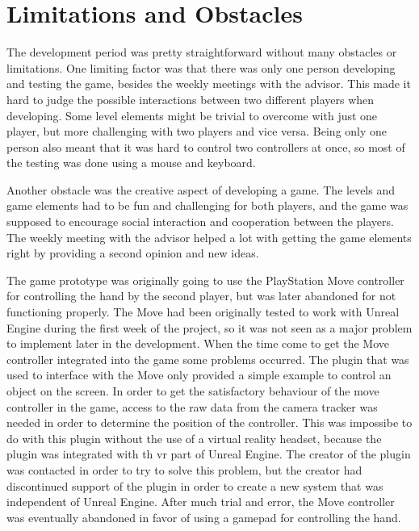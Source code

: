 \section{Limitations and Obstacles}
\label{sec:dev_limitations}
The development period was pretty straightforward without many obstacles or limitations. One limiting factor was that there was only one person developing and testing the game, besides the weekly meetings with the advisor. This made it hard to judge the possible interactions between two different players when developing. Some level elements might be trivial to overcome with just one player, but more challenging with two players and vice versa. Being only one person also meant that it was hard to control two controllers at once, so most of the testing was done using a mouse and keyboard.

Another obstacle was the creative aspect of developing a game. The levels and game elements had to be fun and challenging for both players, and the game was supposed to encourage social interaction and cooperation between the players. The weekly meeting with the advisor helped a lot with getting the game elements right by providing a second opinion and new ideas.

The game prototype was originally going to use the PlayStation Move controller for controlling the hand by the second player, but was later abandoned for not functioning properly. The Move had been originally tested to work with Unreal Engine during the first week of the project, so it was not seen as a major problem to implement later in the development. When the time come to get the Move controller integrated into the game some problems occurred. The plugin that was used to interface with the Move only provided a simple example to control an object on the screen. In order to get the satisfactory behaviour of the move controller in the game, access to the raw data from the camera tracker was needed in order to determine the position of the controller. This was impossibe to do with this plugin without the use of a virtual reality headset, because the plugin was integrated with th \gls{vr} part of Unreal Engine. The creator of the plugin was contacted in order to try to solve this problem, but the creator had discontinued support of the plugin in order to create a new system that was independent of Unreal Engine. After much trial and error, the Move controller was eventually abandoned in favor of using a gamepad for controlling the hand.

